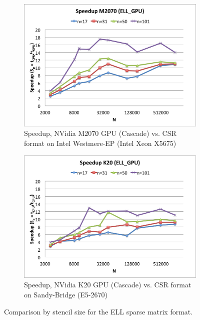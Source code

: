 \documentclass{report}
\begin{document}
\begin{figure}
\begin{subfigure}[t]{0.48\textwidth}
\includegraphics[width=\textwidth]{gpu_content/cascade_spmv/ell_comparison_speedup_cascade_m2070.png}
\caption{Speedup, NVidia M2070 GPU (Cascade) vs. CSR format on Intel Westmere-EP (Intel Xeon X5675)}
\label{fig:ell_speedup_cascade_m2070}
\end{subfigure}
\quad
\begin{subfigure}[t]{0.48\textwidth}
\centering
\includegraphics[width=\textwidth]{gpu_content/cascade_spmv/ell_comparison_speedup_cascade_k20.png}
\caption{Speedup, NVidia K20 GPU (Cascade) vs. CSR format on Sandy-Bridge (E5-2670)}
\label{fig:ell_speedup_cascade_k20}
\end{subfigure}
\caption{Comparison by stencil size for the ELL sparse matrix format.}
\end{figure}
\end{document}
